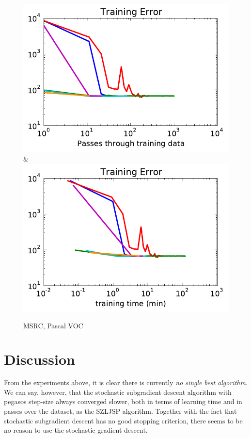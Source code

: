 \begin{figure}
\begin{tabu}
    \includegraphics[width=\linewidth]{evaluation/images/msrc_loss}&%
    \includegraphics[width=\linewidth]{evaluation/images/msrc_time_loss}
    \end{tabu}
\caption{%
    MSRC, Pascal VOC
}
\end{figure}


\section{Discussion}
From the experiments above, it is clear there is currently \emph{no single best algorithm}.
We can say, however, that the stochastic subgradient descent algorithm with
pegasos step-size always converged slower, both in terms of learning time and
in passes over the dataset, as the SZLJSP algorithm.
Together with the fact that stochastic subgradient descent has no good stopping
criterion, there seems to be no reason to use the stochastic gradient descent.
